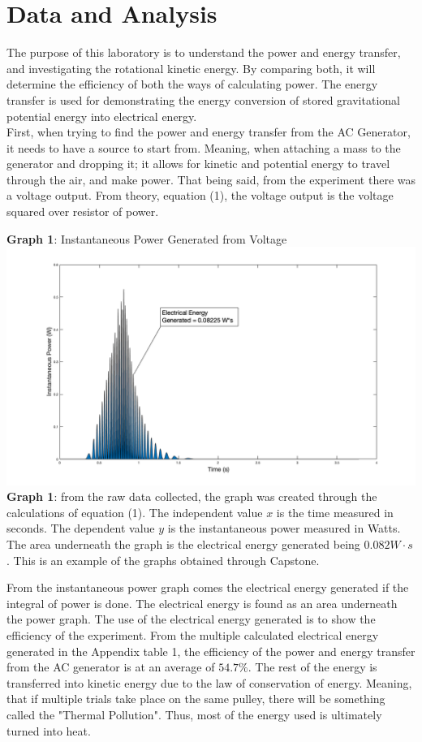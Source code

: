 \documentclass[11pt]{article}
\begin{document}
\section*{Data and Analysis}
The purpose of this laboratory is to understand the power and energy transfer, and investigating the rotational kinetic energy. By comparing both, it will determine the efficiency of both the ways of calculating power. The energy transfer is used for demonstrating the energy conversion of stored gravitational potential energy into electrical energy.\\
First, when trying to find the power and energy transfer from the AC Generator, it needs to have a source to start from. Meaning, when attaching a mass to the generator and dropping it; it allows for kinetic and potential energy to travel through the air, and make power. That being said, from the experiment there was a voltage output. From theory, equation (1), the voltage output is the voltage squared over resistor of power.
\begin{center}
    \textbf{Graph 1}: Instantaneous Power Generated from Voltage\\
    \includegraphics[width=17cm]{1.png}\\\textbf{Graph 1}: from the raw data collected, the graph was created through the calculations of equation (1). The independent value $x$ is the time measured in seconds. The dependent value $y$ is the instantaneous power measured in Watts. The area underneath the graph is the electrical energy generated being $0.082 W\cdot s$. This is an example of the graphs obtained through Capstone. 
\end{center}
From the instantaneous power graph comes the electrical energy generated if the integral of power is done. The electrical energy is found as an area underneath the power graph. The use of the electrical energy generated is to show the efficiency of the experiment. From the multiple calculated electrical energy generated in the Appendix table 1, the efficiency of the power and energy transfer from the AC generator is at an average of $54.7\%$. The rest of the energy is transferred into kinetic energy due to the law of conservation of energy. Meaning, that if multiple trials take place on the same pulley, there will be something called the "Thermal Pollution". Thus, most of the energy used is ultimately turned into heat. \\
\end{document}
